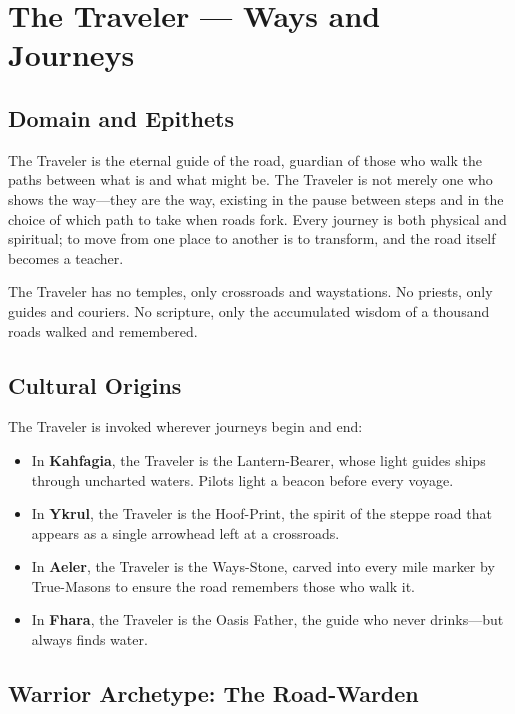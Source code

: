 \section{The Traveler — Ways and Journeys}

\subsection{Domain and Epithets}

The Traveler is the eternal guide of the road, guardian of those who walk the paths between what is and what might be. The Traveler is not merely one who shows the way—they are the way, existing in the pause between steps and in the choice of which path to take when roads fork. Every journey is both physical and spiritual; to move from one place to another is to transform, and the road itself becomes a teacher.

The Traveler has no temples, only crossroads and waystations. No priests, only guides and couriers. No scripture, only the accumulated wisdom of a thousand roads walked and remembered.

\subsection{Cultural Origins}

The Traveler is invoked wherever journeys begin and end:

\begin{itemize}
\item In \textbf{Kahfagia}, the Traveler is the Lantern-Bearer, whose light guides ships through uncharted waters. Pilots light a beacon before every voyage.
\item In \textbf{Ykrul}, the Traveler is the Hoof-Print, the spirit of the steppe road that appears as a single arrowhead left at a crossroads.
\item In \textbf{Aeler}, the Traveler is the Ways-Stone, carved into every mile marker by True-Masons to ensure the road remembers those who walk it.
\item In \textbf{Fhara}, the Traveler is the Oasis Father, the guide who never drinks—but always finds water.
\end{itemize}

\subsection{Warrior Archetype: The Road-Warden}

